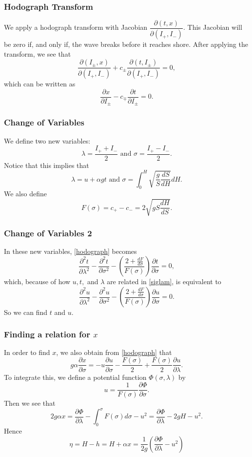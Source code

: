 \begin{frame}
\frametitle{Hodograph Transform}
We apply a hodograph transform with Jacobian $\dfrac{\partial (t,x)}{\partial(I_+, I_-)}$. This Jacobian will be zero if, and only if, the wave breaks before it reaches shore. After applying the transform, we see that
\[
\frac{\partial(I_\pm,x)}{\partial(I_+,I_-)} + c_\pm \frac{\partial (t, I_\pm)}{\partial(I_+,I_-)} = 0,
\]
which can be written as
\begin{equation}\label{hodograph}
\frac{\partial x}{\partial I_\pm} - c_\mp \frac{\partial t}{\partial I_\pm} = 0.
\end{equation}
\end{frame}

\begin{frame}
\frametitle{Change of Variables}
We define two new variables:
\[
\lambda = \frac{I_+ + I_-}{2} \text{ and } \sigma = \frac{I_+ - I_-}{2}.
\]
Notice that this implies that
\begin{equation} \label{siglam}
\lambda = u + \alpha g t \text{ and } \sigma = \int_0^H \sqrt{\frac{g}{S} \frac{dS}{dH}}dH.
\end{equation}
We also define
\[
F(\sigma) = c_+ - c_- = 2 \sqrt{gS \frac{dH}{dS}}.
\]
\end{frame}

\begin{frame}
\frametitle{Change of Variables 2}
In these new variables, \eqref{hodograph} becomes
\[
\frac{\partial^2 t}{\partial \lambda^2} - \frac{\partial^2 t}{\partial \sigma^2} - \left( \frac{2 + \frac{dF}{d\sigma}}{F(\sigma)} \right) \frac{\partial t}{\partial \sigma} = 0,
\]
which, because of how $u,t,$ and $\lambda$ are related in \eqref{siglam}, is equivalent to
\begin{equation}\label{finalu}
\frac{\partial^2 u}{\partial \lambda^2} - \frac{\partial^2 u}{\partial \sigma^2} - \left( \frac{2 + \frac{dF}{d\sigma}}{F(\sigma)} \right) \frac{\partial u}{\partial \sigma} = 0.
\end{equation}
So we can find $t$ and $u$.
\end{frame}

\begin{frame}
\frametitle{Finding a relation for $x$}
In order to find $x$, we also obtain from \eqref{hodograph} that
\[
g \alpha \frac{\partial x}{\partial \sigma} = - u \frac{\partial u}{\partial \sigma} - \frac{F(\sigma)}{2} + \frac{F(\sigma)}{2} \frac{\partial u}{\partial \lambda}.
\]
To integrate this, we define a potential function $\Phi(\sigma,\lambda)$ by
\[
u = \frac{1}{F(\sigma)} \frac{\partial \Phi}{\partial \sigma}.
\]
Then we see that
\[
2 g \alpha x = \frac{\partial \Phi}{\partial \lambda} - \int_0^\sigma F(\sigma) d\sigma - u^2 = \frac{\partial \Phi}{\partial \lambda} - 2gH - u^2.
\]
Hence
\[
\eta = H - h = H + \alpha x = \frac{1}{2g} \left(\frac{\partial \Phi}{\partial \lambda} - u^2 \right)
\]
\end{frame}








